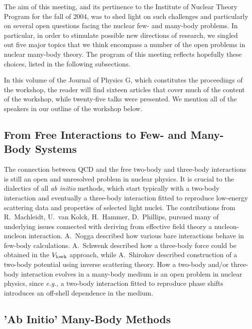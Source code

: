 \documentclass[12pt]{iopart}
\begin{document}
The aim of this meeting, and its pertinence to the Institute of Nuclear 
Theory Program for the fall of 2004, was to shed light  
on such challenges and particularly 
on several open questions facing the 
nuclear few- and many-body problems. In 
particular, in order to stimulate possible 
new directions of research, we singled out five major topics 
that we think encompass a number of the open 
problems in nuclear many-body theory. 
The program of this meeting 
reflects hopefully these choices, 
listed in the following subsections. 

In this volume of the Journal of Physics G, which constitutes
the proceedings of the workshop, the reader will find sixteen articles
that cover much of the content of the workshop, while twenty-five
talks were presented. We mention all of the speakers in our outline
of the workshop below. 

\subsection{From Free Interactions to Few- and Many-Body Systems}  

The connection between QCD and the free two-body and three-body interactions
is still an open and unresolved problem in nuclear physics. 
It is crucial to the dialectics of all {\it ab initio} methods, which start 
typically with a two-body interaction and eventually a three-body interaction 
fitted to reproduce low-energy scattering data and properties
of selected light nuclei. The contributions from 
R.~Machleidt, U.~van Kolck, H.~Hammer, D.~Phillips,
pursued many of underlying issues connected with deriving
from effective field theory a nucleon-nucleon interaction. 
A.~Nogga described how various bare interactions behave in few-body
calculations.  A.~Schwenk described how a three-body 
force could be obtained in the $V_{\rm lowk}$ approach, while 
A.~Shirokov described 
construction of a two-body potential using inverse
scattering theory. How a two-body and/or three-body 
interaction evolves in a many-body medium is an 
open problem in nuclear physics, since {\it e.g.,} a two-body interaction 
fitted to reproduce phase shifts introduces an off-shell dependence 
in the medium. 

\subsection{'Ab Initio' Many-Body Methods}
\end{document}
